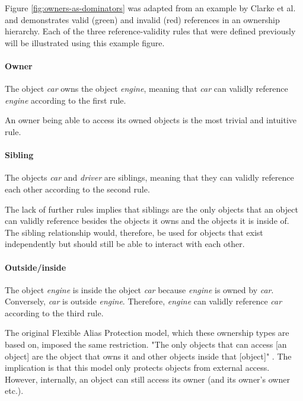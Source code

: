 \documentclass[sigplan,11pt,nonacm]{acmart}
\begin{document}
Figure \ref{fig:owners-as-dominators} was adapted from an example by Clarke et al. \cite{flexible-alias-protection} and demonstrates valid (green) and invalid (red) references in an ownership hierarchy.
Each of the three reference-validity rules that were defined previously will be illustrated using this example figure.


\paragraph{Owner}

The object \emph{car} owns the object \emph{engine}, meaning that \emph{car} can validly reference \emph{engine} according to the first rule.

An owner being able to access its owned objects is the most trivial and intuitive rule.


\paragraph{Sibling}

The objects \emph{car} and \emph{driver} are siblings, meaning that they can validly reference each other according to the second rule.

The lack of further rules implies that siblings are the only objects that an object can validly reference besides the objects it owns and the objects it is inside of.
The sibling relationship would, therefore, be used for objects that exist independently but should still be able to interact with each other.


\paragraph{Outside/inside}

The object \emph{engine} is inside the object \emph{car} because \emph{engine} is owned by \emph{car}.
Conversely, \emph{car} is outside \emph{engine}.
Therefore, \emph{engine} can validly reference \emph{car} according to the third rule.

The original Flexible Alias Protection model, which these ownership types are based on, imposed the same restriction.
"The only objects that can access [an object] are the object that owns it and other objects inside that [object]" \cite{flexible-alias-protection}.
The implication is that this model only protects objects from external access.
However, internally, an object can still access its owner (and its owner's owner etc.).
\end{document}
